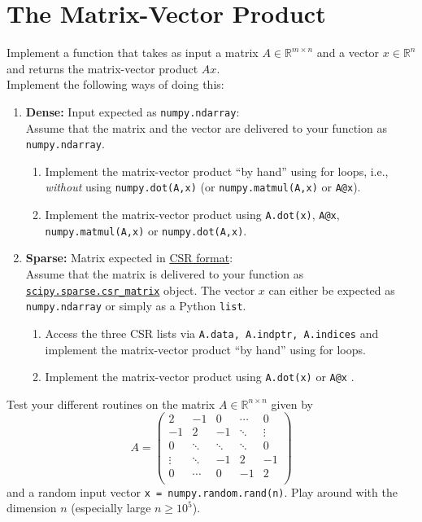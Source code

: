 \section{The Matrix-Vector Product}
Implement a function that takes as input a matrix $A \in \mathbb{R}^{m\times n}$ and a vector $x \in \mathbb{R}^{n}$ and returns the matrix-vector product $Ax$.
~\\

Implement the following ways of doing this:
\begin{enumerate}	
	\item \textbf{Dense:} Input expected as \verb|numpy.ndarray|:\\
		  Assume that the matrix and the vector are delivered to your function as \verb|numpy.ndarray|.
	\begin{enumerate}
		\item Implement the matrix-vector product ``by hand'' using for loops, i.e., \textit{without} using \verb|numpy.dot(A,x)| (or \verb|numpy.matmul(A,x)| or \verb|A@x|).
		\item Implement the matrix-vector product using \texttt{A.dot(x)}, \verb|A@x|, \verb|numpy.matmul(A,x)| or \verb|numpy.dot(A,x)|. 
	\end{enumerate}
	\item \textbf{Sparse:} Matrix expected in \hyperref{https://en.wikipedia.org/wiki/Sparse_matrix#Compressed_sparse_row_(CSR,_CRS_or_Yale_format)}{}{}{CSR format}:\\
	Assume that the matrix is delivered to your function as \hyperref{https://docs.scipy.org/doc/scipy/reference/generated/scipy.sparse.csr_matrix.html}{}{}{\texttt{scipy.sparse.csr\_matrix}} object. The vector $x$ can either be expected as \verb|numpy.ndarray| or simply as a Python \texttt{list}. 	
	\begin{enumerate}
		\item Access the three CSR lists via \texttt{A.data, A.indptr, A.indices} and implement the matrix-vector product ``by hand'' using for loops.
		\item Implement the matrix-vector product using \texttt{A.dot(x)} or \texttt{A@x} . %
	\end{enumerate}
\end{enumerate}


Test your different routines on the matrix $A \in \mathbb{R}^{n \times n}$ given by 
$$A = \begin{pmatrix}
2 & -1 		& 0  &\cdots & 0\\
-1 & 2 		& -1  &\ddots &  \vdots\\
0 & \ddots  		&\ddots   	 &\ddots  & 0 \\
\vdots    & \ddots  		&-1  	 &2 & -1\\
0 & \cdots 	&  0  &-1 & 2\\
\end{pmatrix}$$
and a random input vector \verb|x = numpy.random.rand(n)|. Play around with the dimension $n$ (especially large $n\geq 10^5$).\\

